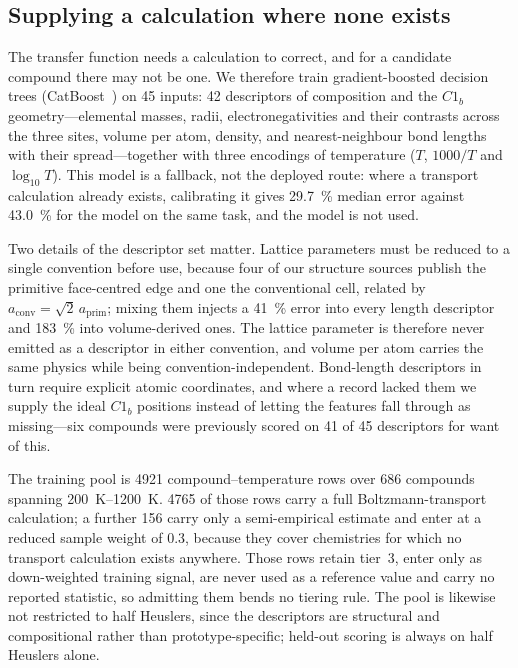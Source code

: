 \subsection{Supplying a calculation where none exists}
\label{sec:model}

The transfer function needs a calculation to correct, and for a candidate compound there may not be
one. We therefore train gradient-boosted decision trees
(CatBoost~\cite{prokhorenkova2017catboost}) on \num{45} inputs: \num{42} descriptors of composition
and the $C1_b$ geometry---elemental masses, radii, electronegativities and their contrasts across
the three sites, volume per atom, density, and nearest-neighbour bond lengths with their
spread---together with three encodings of temperature ($T$, $1000/T$ and $\log_{10}T$). This model
is a fallback, not the deployed route: where a transport calculation already exists, calibrating it
gives \SI{29.7}{\percent} median error against \SI{43.0}{\percent} for the model on the same task,
and the model is not used.

Two details of the descriptor set matter. Lattice parameters must be reduced to a single convention
before use, because four of our structure sources publish the primitive face-centred edge and one
the conventional cell, related by $a_\mathrm{conv} = \sqrt{2}\,a_\mathrm{prim}$; mixing them
injects a \SI{41}{\percent} error into every length descriptor and \SI{183}{\percent} into
volume-derived ones. The lattice parameter is therefore never emitted as a descriptor in either
convention, and volume per atom carries the same physics while being convention-independent.
Bond-length descriptors in turn require explicit atomic coordinates, and where a record lacked them
we supply the ideal $C1_b$ positions instead of letting the features fall through as missing---six
compounds were previously scored on \num{41} of \num{45} descriptors for want of this.

The training pool is \num{4921} compound--temperature rows over \num{686} compounds spanning
\SIrange{200}{1200}{\kelvin}. \num{4765} of those rows carry a full Boltzmann-transport
calculation; a further \num{156} carry only a semi-empirical estimate and enter at a reduced sample
weight of \num{0.3}, because they cover chemistries for which no transport calculation exists
anywhere. Those rows retain tier~3, enter only as down-weighted training signal, are never used as
a reference value and carry no reported statistic, so admitting them bends no tiering rule. The
pool is likewise not restricted to half Heuslers, since the descriptors are structural and
compositional rather than prototype-specific; held-out scoring is always on half Heuslers alone.

